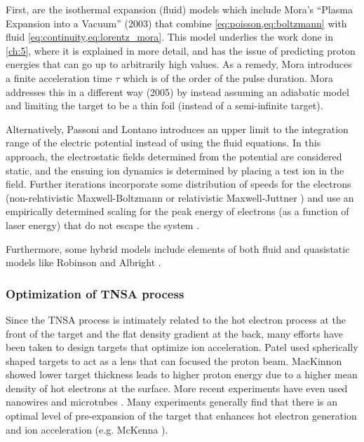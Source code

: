 First, are the isothermal expansion (fluid) models which include Mora's ``Plasma Expansion into a Vacuum'' \cite{Mora_2003_PRL} (2003) that combine \cref{eq:poisson,eq:boltzmann} with fluid \cref{eq:continuity,eq:lorentz_mora}. This model underlies the work done in \cref{ch:5}, where it is explained in more detail, and has the issue of predicting proton energies that can go up to arbitrarily high values. As a remedy, Mora introduces a finite acceleration time $\tau$ which is of the order of the pulse duration. Mora \cite{Mora_2005_PRE} addresses this in a different way (2005) by instead assuming an adiabatic model and limiting the target to be a thin foil (instead of a semi-infinite target). 

Alternatively, Passoni and Lontano \cite{Passoni_2004_LaPB} introduces an upper limit to the integration range of the electric potential instead of using the fluid equations. In this approach, the electrostatic fields determined from the potential are considered static, and the ensuing ion dynamics is determined by placing a test ion in the field. Further iterations incorporate some distribution of speeds for the electrons (non-relativistic Maxwell-Boltzmann \cite{Lontano_2006_PoP} or relativistic Maxwell-Juttner \cite{Passoni_2008_PRL}) and use an empirically determined scaling for the peak energy of electrons (as a function of laser energy) that do not escape the system \cite{Perego_2012_RevSci}.

Furthermore, some hybrid models include elements of both fluid and quasistatic models like Robinson \cite{Robinson_2006_PRL} and Albright \cite{Albright_2006_PRL}.

\subsubsection{Optimization of TNSA process} \label{sec:tnsa_opt}

Since the \gls{TNSA} process is intimately related to the hot electron process at the front of the target and the flat density gradient at the back, many efforts have been taken to design targets that optimize ion acceleration. Patel \cite{Patel_2003_PRL} used spherically shaped targets to act as a lens that can focused the proton beam. MacKinnon \cite{Mackinnon_2002_PRL} showed lower target thickness leads to higher proton energy due to a higher mean density of hot electrons at the surface. More recent experiments have even used nanowires \cite{Vallieres_2021_Nature} and microtubes \cite{Strehlow_2022_Nature}. Many experiments generally find that there is an optimal level of pre-expansion of the target that enhances hot electron generation and ion acceleration (e.g. McKenna \cite{McKenna_2008_LaPB}).

